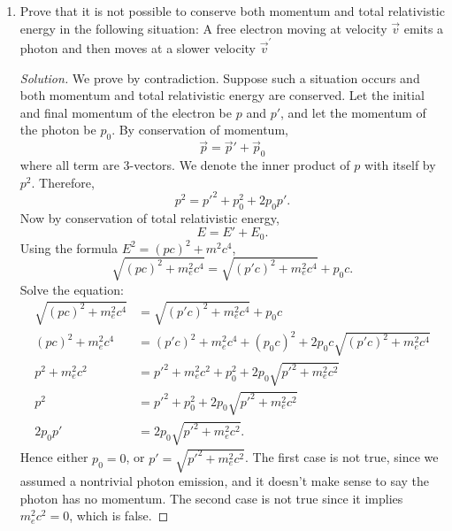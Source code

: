 \begin{enumerate}
\newpage
\item Prove that it is not possible to conserve both momentum and total relativistic energy in the following situation: A free electron moving at velocity $\vec{v}$ emits a photon and then moves at a slower velocity $\vec{v}^{\prime}$
\begin{proof}[Solution]
	We prove by contradiction. Suppose such a situation occurs and both momentum and total relativistic energy are conserved. Let the initial and final momentum of the electron be $p$ and $p'$, and let the momentum of the photon be $p_0$. By conservation of momentum,  \[
		\vec{p}  = \vec{p} ' + \vec{p} _0
	\] where all term are 3-vectors. We denote the inner product of $p$ with itself by $p^2$. Therefore, 
	\[
		p^2 = p'^2 + p_0^2 + 2 p_0 p'
	.\] 
	Now by conservation of total relativistic energy,
	\[
		E = E' + E_0
	.\] 
	Using the formula $E^2 = (pc)^2 + m^2 c^4$,
	\[
		\sqrt{(pc)^2 + m_e^2 c^4}  = 
		\sqrt{(p'c)^2 + m_e^2 c^4} + 
		p_0c
	.\] 
	Solve the equation:
	\begin{align*}
		\sqrt{(pc)^2 + m_e^2 c^4}  &= 
		\sqrt{(p'c)^2 + m_e^2 c^4} + 
		p_0c\\
		(pc)^2 + m_e^2 c^4  &= 
		(p'c)^2 + m_e^2 c^4 + 
		(p_0c)^2 +
		2 p_0 c \sqrt{(p'c)^2 + m_e^2 c^4}\\
		p^2 + m_e^2 c^2  &= 
		p'^2 + m_e^2 c^2 + 
		p_0^2 +
		2 p_0 \sqrt{p'^2 + m_e^2 c^2}\\
		p^2  &= 
		p'^2 +  p_0^2 +
		2 p_0 \sqrt{p'^2 + m_e^2 c^2}\\
		2 p_0 p' &=  2 p_0 \sqrt{p'^2 + m_e^2 c^2}
	.\end{align*}
	Hence either $p_0 = 0$, or $p' = \sqrt{p'^2 + m^2 _e c^2} $. The first case is not true, since we assumed a nontrivial photon emission, and it doesn't make sense to say the photon has no momentum. The second case is not true since it implies $m_e^2 c^2 = 0$, which is false.
\end{proof}

\end{enumerate}
